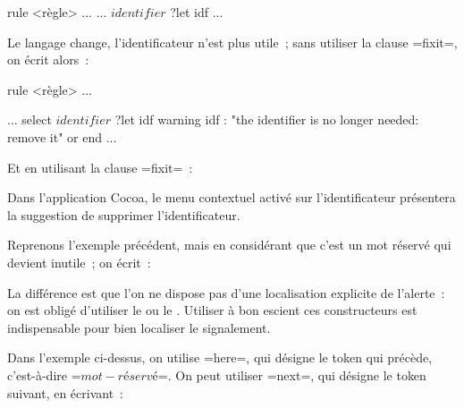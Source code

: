 \begin{galgas}
rule <règle> ... {
  ...
  $identifier$ ?let idf
  ...
}
\end{galgas}

Le langage change, l'identificateur n'est plus utile~; sans utiliser la clause \ggs=fixit=, on écrit alors~:

\begin{galgas}
rule <règle> ... {
  ...
  select
    $identifier$ ?let idf
    warning idf : "the identifier is no longer needed: remove it"
  or
  end
  ...
  
}
\end{galgas}


Et en utilisant la clause \ggs=fixit=~:


Dans l'application Cocoa, le menu contextuel activé sur l'identificateur présentera la suggestion de supprimer l'identificateur.



Reprenons l'exemple précédent, mais en considérant que c'est un mot réservé qui devient inutile~; on écrit~:


La différence est que l'on ne dispose pas d'une localisation explicite de l'alerte~: on est obligé d'utiliser le  ou le . Utiliser à bon escient ces constructeurs est indispensable pour bien localiser le signalement.

Dans l'exemple ci-dessus, on utilise \ggs=here=, qui désigne le token qui précède, c'est-à-dire \ggs=$mot-réservé$=. On peut utiliser \ggs=next=, qui désigne le token suivant, en écrivant~:



